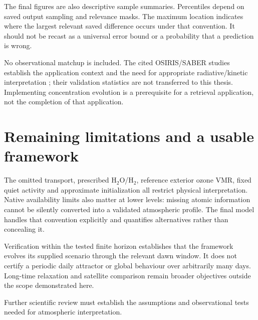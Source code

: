 The final figures are also descriptive sample summaries. Percentiles depend on saved output sampling and relevance masks. The maximum location indicates where the largest relevant saved difference occurs under that convention. It should not be recast as a universal error bound or a probability that a prediction is wrong.

No observational matchup is included. The cited OSIRIS/SABER studies establish the application context and the need for appropriate radiative/kinetic interpretation \citep{li2020,mlynczak2007}; their validation statistics are not transferred to this thesis. Implementing concentration evolution is a prerequisite for a retrieval application, not the completion of that application.

\section{Remaining limitations and a usable framework}
The omitted transport, prescribed H$_2$O/H$_2$, reference exterior ozone VMR, fixed quiet activity and approximate initialization all restrict physical interpretation. Native availability limits also matter at lower levels: missing atomic information cannot be silently converted into a validated atmospheric profile. The final model handles that convention explicitly and quantifies alternatives rather than concealing it.

Verification within the tested finite horizon establishes that the framework evolves its supplied scenario through the relevant dawn window. It does not certify a periodic daily attractor or global behaviour over arbitrarily many days. Long-time relaxation and satellite comparison remain broader objectives outside the scope demonstrated here.

Further scientific review must establish the assumptions and observational tests needed for atmospheric interpretation.
